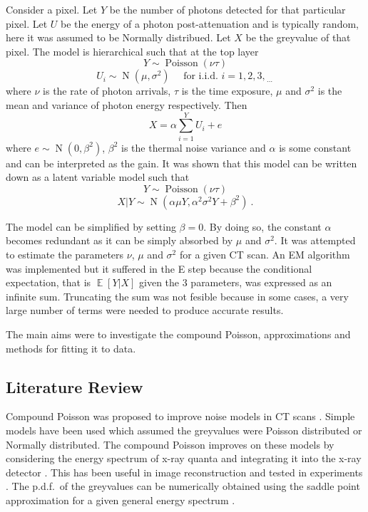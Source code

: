 \documentclass[a4paper]{proc}
\DeclareMathOperator{\expectation}{\mathbb{E}}
\DeclareMathOperator{\normal}{N}
\DeclareMathOperator{\poisson}{Poisson}
\newcommand{\dotdotdot}{_{\phantom{.}\cdots}}
\begin{document}
Consider a pixel. Let $Y$ be the number of photons detected for that particular pixel. Let $U$ be the energy of a photon post-attenuation and is typically random, here it was assumed to be Normally distribued. Let $X$ be the greyvalue of that pixel. The model is hierarchical such that at the top layer
\begin{equation}
Y\sim\poisson\left(\nu\tau\right)
\end{equation}
\begin{equation}
U_i\sim\normal\left(\mu,\sigma^2\right) \quad \text{ for i.i.d. }i=1,2,3,\dotdotdot
\end{equation}
where $\nu$ is the rate of photon arrivals, $\tau$ is the time exposure, $\mu$ and $\sigma^2$ is the mean and variance of photon energy respectively. Then
\begin{equation}
X = \alpha\sum_{i=1}^Y U_i + e
\end{equation}
where $e\sim\normal(0,\beta^2)$, $\beta^2$ is the thermal noise variance and $\alpha$ is some constant and can be interpreted as the gain. It was shown that this model can be written down as a latent variable model such that 
\begin{equation}
Y\sim\poisson\left(\nu\tau\right)
\end{equation}
\begin{equation}
X|Y\sim\normal\left(\alpha\mu Y, \alpha^2\sigma^2 Y + \beta^2\right) \ .
\end{equation}

The model can be simplified by setting $\beta=0$. By doing so, the constant $\alpha$ becomes redundant as it can be simply absorbed by $\mu$ and $\sigma^2$. It was attempted to estimate the parameters $\nu$, $\mu$ and $\sigma^2$ for a given CT scan. An EM algorithm \cite{dempster1977maximum} was implemented but it suffered in the E step because the conditional expectation, that is $\expectation\left[Y|X\right]$ given the 3 parameters, was expressed as an infinite sum. Truncating the sum was not fesible because in some cases, a very large number of terms were needed to produce accurate results.

The main aims were to investigate the compound Poisson, approximations and methods for fitting it to data.

\subsection{Literature Review}
Compound Poisson was proposed to improve noise models in CT scans \cite{whiting2002signal}. Simple models have been used which assumed the greyvalues were Poisson distributed or Normally \cite{lu2002analytical} distributed. The compound Poisson improves on these models by considering the energy spectrum of x-ray quanta and integrating it into the x-ray detector \cite{whiting2006properties}. This has been useful in image reconstruction \cite{elbakri2003efficient}\cite{elbakri2002statistical}\cite{elbakri2001statistical}\cite{lasio2007statistical} and tested in experiments \cite{wang2008experimental}. The p.d.f.~of the greyvalues can be numerically obtained using the saddle point approximation for a given general energy spectrum \cite{elbakri2003efficient}.
\end{document}
